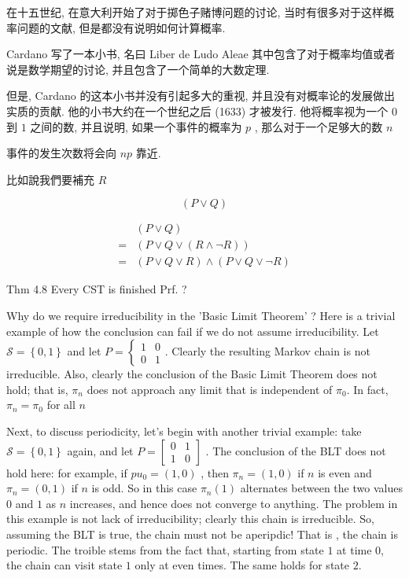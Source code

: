 \documentclass[a4paper, 10pt]{ctexbook} %
\begin{document}
在十五世纪, 在意大利开始了对于掷色子赌博问题的讨论, 当时有很多对于这样概率问题的文献, 但是都没有说明如何计算概率. 

Cardano 写了一本小书, 名曰 Liber de Ludo Aleae 其中包含了对于概率均值或者说是数学期望的讨论, 并且包含了一个简单的大数定理. 

但是, Cardano 的这本小书并没有引起多大的重视, 并且没有对概率论的发展做出实质的贡献. 他的小书大约在一个世纪之后 (1633) 才被发行. 他将概率视为一个 $0$ 到 $1$ 之间的数, 并且说明, 如果一个事件的概率为 $p$ , 那么对于一个足够大的数 $n$

事件的发生次数将会向 $np$ 靠近. 






比如說我們要補充 $R$

$$ \left(P \vee Q \right)$$

$$ \begin{aligned} & \left(P \vee Q \right) \\ = & \left(P \vee Q \vee \left( R \wedge \neg R\right)\right)\\ = & \left( P \vee Q \vee R\right) \wedge \left(P \vee Q \vee \neg R\right) \end{aligned} $$

Thm 4.8 Every CST is finished 
Prf. ?

Why do we require irreducibility in the 'Basic Limit Theorem' ? Here is a trivial 
example of how the conclusion can fail if we do not assume irreducibility. Let $\mathcal S  =\left\{ 0,1 \right\}$
and let $P = \begin{cases} 1 & 0 \\ 0 & 1 \end{cases} $. Clearly the resulting Markov chain is not irreducible. Also, clearly
the conclusion of the Basic Limit Theorem does not hold; that is, $\pi_{n}$ does not approach 
any limit that is independent of $\pi_{0}$. In fact, $\pi_{n} = \pi_{0}$ for all $n$

Next, to discuss periodicity, let's begin with another trivial example: take $\mathcal S = \left\{ 0 ,1\right\}$
again, and let $P  = \begin{bmatrix} 0 & 1 \\ 1 & 0 \end{bmatrix} $ . The conclusion of the BLT does not hold here: 
for example, if $pu_{0} = \left(1,0\right)$ , then $\pi_{n}  = \left(1, 0\right)$ if $n $ is even and $\pi_{n} =\left( 0,1\right)$ if $n$ is odd. 
So in this case $\pi_{n} \left(1\right)$ alternates between the two values $0$ and $1$ as $n$ increases, and hence 
does not converge to anything. The problem in this example is not lack of irreducibility; 
clearly this chain is irreducible. So, assuming the BLT is true, the chain must not be aperipdic! That is , the chain is periodic. The troible stems from the fact 
that, starting from state $1$ at time $0$, the chain can visit state $1$ only at even times. 
The same holds for state $2$. 
\end{document}
